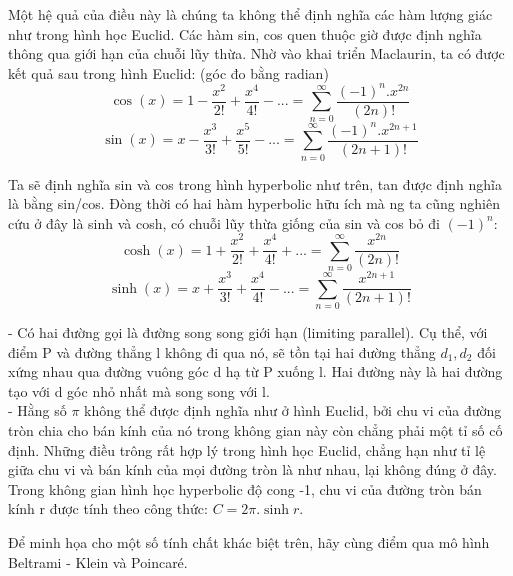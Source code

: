 \begin{multicols}{2}
	Một hệ quả của điều này là chúng ta không thể định nghĩa các hàm lượng giác như trong hình học Euclid. Các hàm sin, cos quen thuộc giờ được định nghĩa thông qua giới hạn của chuỗi lũy thừa. Nhờ vào khai triển Maclaurin, ta có được kết quả sau trong hình Euclid: (góc đo bằng radian)
	\[ \cos(x) =  1 - \frac{x^2}{2!} + \frac{x^4}{4!} - ... = \sum_{n=0}^{\infty} \frac{(-1)^n.x^{2n}}{(2n)!} \]
	\[  \sin(x) =  x - \frac{x^3}{3!} + \frac{x^5}{5!} - ... = \sum_{n=0}^{\infty} \frac{(-1)^n.x^{2n+1}}{(2n+1)!} \]
	
	Ta sẽ định nghĩa sin và cos trong hình hyperbolic như trên, tan được định nghĩa là bằng sin/cos.
	Đòng thời có hai hàm hyperbolic hữu ích mà ng ta cũng nghiên cứu ở đây là sinh và cosh, có chuỗi lũy thừa giống của sin và cos bỏ đi $(-1)^n$:
	\[ \cosh(x) =  1 + \frac{x^2}{2!} + \frac{x^4}{4!} + ... = \sum_{n=0}^{\infty} \frac{x^{2n}}{(2n)!} \]
	\[  \sinh(x) =  x + \frac{x^3}{3!} + \frac{x^4}{4!} - ... = \sum_{n=0}^{\infty} \frac{x^{2n+1}}{(2n+1)!} \]
	
	- Có hai đường gọi là đường song song giới hạn (limiting parallel). Cụ thể, với điểm P và đường thẳng l không đi qua nó, sẽ tồn tại hai đường thẳng $d_1, d_2$ đối xứng nhau qua đường vuông góc d hạ từ P xuống l. Hai đường này là hai đường tạo với d góc nhỏ nhất mà song song với l. \\
	- Hằng số $\pi$  không thể được định nghĩa như ở hình Euclid, bởi chu vi của đường tròn chia cho bán kính của nó trong không gian này còn chẳng phải một tỉ số cố định. Những điều trông rất hợp lý trong hình học Euclid, chẳng hạn như tỉ lệ giữa chu vi và bán kính của mọi đường tròn là như nhau, lại không đúng ở đây. Trong không gian hình học hyperbolic độ cong -1, chu vi của đường tròn bán kính r được tính theo công thức: $C = 2\pi.\sinh r$. 
	
	
	Để minh họa cho một số tính chất khác biệt trên, hãy cùng điểm qua mô hình Beltrami - Klein và Poincaré.  
	

\end{multicols}
